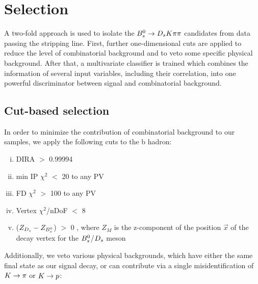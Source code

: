 \section{Selection}
\label{sec:Selection}

A two-fold approach is used to isolate the ${{B}^0_{s}}\rightarrow{\ensuremath{{D}_{s}}}{\ensuremath{K}}{\ensuremath{\pi}}{\ensuremath{\pi}}$ candidates from data passing the stripping line. 
First, further one-dimensional cuts are applied to reduce the level of combinatorial background and to veto some specific physical background. 
After that, a multivariate classifier is trained which combines the information of several input variables, including their correlation, into one powerful discriminator
between signal and combinatorial background. 

\subsection{Cut-based selection}

In order to minimize the contribution of combinatorial background to our samples, we apply the following cuts to the b hadron:

\begin{enumerate}[(i)]

\item DIRA $>$ 0.99994

\item min IP $\chi^{2}$ $<$ 20 to any PV

\item FD $\chi^{2}$ $>$ 100 to any PV

\item Vertex $\chi^{2}$/nDoF $<$ 8 

\item ($Z_{{{D}_{s}}}-Z_{{{B}^0_{s}}}$) $>$ 0 , where $Z_{M}$ is the z-component of the position $\vec{x}$ of the decay vertex for the ${{B}^0_{s}}$/${{D}_{s}}$ meson

\end{enumerate}    


Additionally, we veto various physical backgrounds, which have either the same final state as our signal decay, or can contribute via a single misidentification of ${K}\rightarrow{\ensuremath{\pi}}$ or ${K}\rightarrow{\ensuremath{p}}$:

